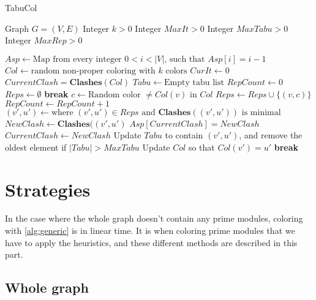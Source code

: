 \documentclass{amsart}
\newcommand{\algorithmicbreak}{\textbf{break}}
\newcommand{\BREAK}{\STATE \algorithmicbreak}
\begin{document}
\begin{algorithm}[H]
    \caption{TabuCol}
    \begin{algorithmic}[1]
        \REQUIRE Graph $G = (V,E)$
        \REQUIRE Integer $k > 0$
        \REQUIRE Integer $MaxIt > 0$
        \REQUIRE Integer $MaxTabu > 0$
        \REQUIRE Integer $MaxRep > 0$
      
        \STATE $Asp \leftarrow \text{Map from every integer $0 < i < |V|$, such that $Asp[i] = i-1$}$
        \STATE $Col \leftarrow \text{random non-proper coloring with $k$ colors}$
        \STATE $CurIt \leftarrow 0$
        \STATE $CurrentClash = \textbf{Clashes}(Col)$
        \STATE $Tabu \leftarrow \text{Empty tabu list}$
            \STATE $RepCount \leftarrow 0$
            \STATE $Reps \leftarrow \emptyset$
                    \BREAK
                \ENDIF
                \STATE $c \leftarrow \text{Random color $\neq Col(v)$ in $Col$}$
                    \STATE $Reps \leftarrow Reps \cup \{(v,c)\}$
                \ENDIF
                \STATE $RepCount \leftarrow RepCount + 1$
            \ENDFOR
            \STATE $(v',u') \leftarrow \text{where $(v',u') \in Reps$ and $\textbf{Clashes}( (v',u'))$ is minimal }$
            \STATE $NewClash \leftarrow \textbf{Clashes}( (v',u')$
                \STATE $Asp[CurrentClash] = NewClash$
            \ENDIF
            \STATE $CurrentClash \leftarrow NewClash$
            \STATE Update $Tabu$ to contain $(v',u')$, and remove the oldest element if $|Tabu| > MaxTabu$
            \STATE Update $Col$ so that $Col(v') = u'$
                \BREAK
            \ENDIF
        \ENDWHILE
    \end{algorithmic}
\end{algorithm}


\section{Strategies}
\label{sec:Strategies}
In the case where the whole graph doesn't contain any prime modules, coloring
with \autoref{alg:generic} is in linear time. It is when coloring prime modules
that we have to apply the heuristics, and these different methods are
described in this part.

\subsection{Whole graph}
\end{document}
